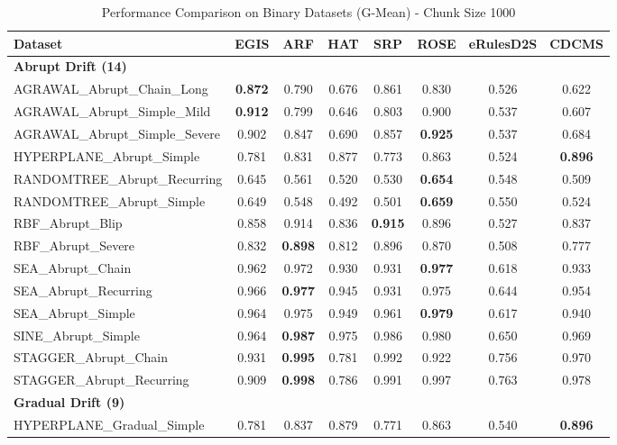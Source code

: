 \begin{table}[ht]
\centering
\caption{Performance Comparison on Binary Datasets (G-Mean) - Chunk Size 1000}
\label{tab:binary_comparison}
\footnotesize
\begin{tabular}{l|ccccccc}
\toprule
\textbf{Dataset} & \textbf{EGIS} & \textbf{ARF} & \textbf{HAT} & \textbf{SRP} & \textbf{ROSE} & \textbf{eRulesD2S} & \textbf{CDCMS} \\
\midrule
\multicolumn{8}{l}{\textbf{Abrupt Drift (14)}} \\
AGRAWAL\_Abrupt\_Chain\_Long & \textbf{0.872} & 0.790 & 0.676 & 0.861 & 0.830 & 0.526 & 0.622 \\
AGRAWAL\_Abrupt\_Simple\_Mild & \textbf{0.912} & 0.799 & 0.646 & 0.803 & 0.900 & 0.537 & 0.607 \\
AGRAWAL\_Abrupt\_Simple\_Severe & 0.902 & 0.847 & 0.690 & 0.857 & \textbf{0.925} & 0.537 & 0.684 \\
HYPERPLANE\_Abrupt\_Simple & 0.781 & 0.831 & 0.877 & 0.773 & 0.863 & 0.524 & \textbf{0.896} \\
RANDOMTREE\_Abrupt\_Recurring & 0.645 & 0.561 & 0.520 & 0.530 & \textbf{0.654} & 0.548 & 0.509 \\
RANDOMTREE\_Abrupt\_Simple & 0.649 & 0.548 & 0.492 & 0.501 & \textbf{0.659} & 0.550 & 0.524 \\
RBF\_Abrupt\_Blip & 0.858 & 0.914 & 0.836 & \textbf{0.915} & 0.896 & 0.527 & 0.837 \\
RBF\_Abrupt\_Severe & 0.832 & \textbf{0.898} & 0.812 & 0.896 & 0.870 & 0.508 & 0.777 \\
SEA\_Abrupt\_Chain & 0.962 & 0.972 & 0.930 & 0.931 & \textbf{0.977} & 0.618 & 0.933 \\
SEA\_Abrupt\_Recurring & 0.966 & \textbf{0.977} & 0.945 & 0.931 & 0.975 & 0.644 & 0.954 \\
SEA\_Abrupt\_Simple & 0.964 & 0.975 & 0.949 & 0.961 & \textbf{0.979} & 0.617 & 0.940 \\
SINE\_Abrupt\_Simple & 0.964 & \textbf{0.987} & 0.975 & 0.986 & 0.980 & 0.650 & 0.969 \\
STAGGER\_Abrupt\_Chain & 0.931 & \textbf{0.995} & 0.781 & 0.992 & 0.922 & 0.756 & 0.970 \\
STAGGER\_Abrupt\_Recurring & 0.909 & \textbf{0.998} & 0.786 & 0.991 & 0.997 & 0.763 & 0.978 \\
\multicolumn{8}{l}{\textbf{Gradual Drift (9)}} \\
HYPERPLANE\_Gradual\_Simple & 0.781 & 0.837 & 0.879 & 0.771 & 0.863 & 0.540 & \textbf{0.896} \\

\end{tabular}
\end{table}

